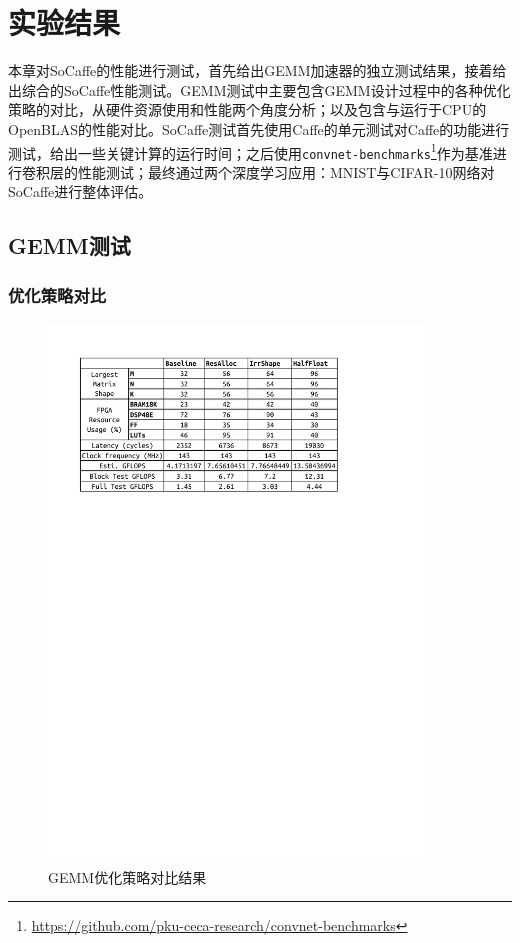 \chapter{实验结果}

本章对SoCaffe的性能进行测试，首先给出GEMM加速器的独立测试结果，接着给出综合的SoCaffe性能测试。GEMM测试中主要包含GEMM设计过程中的各种优化策略的对比，从硬件资源使用和性能两个角度分析；以及包含与运行于CPU的OpenBLAS的性能对比。SoCaffe测试首先使用Caffe的单元测试对Caffe的功能进行测试，给出一些关键计算的运行时间；之后使用\texttt{convnet-benchmarks}\footnote{\url{https://github.com/pku-ceca-research/convnet-benchmarks}}作为基准进行卷积层的性能测试；最终通过两个深度学习应用：MNIST与CIFAR-10网络对SoCaffe进行整体评估。

\section{GEMM测试}

\subsection{优化策略对比}\label{subsec:compare}

\begin{figure}[!ht]
\centering	
\includegraphics[width=0.9\textwidth]{assets/imgs/gemmopt.pdf}
\caption{GEMM优化策略对比结果}
\label{fig:gemmopt}
\end{figure}

